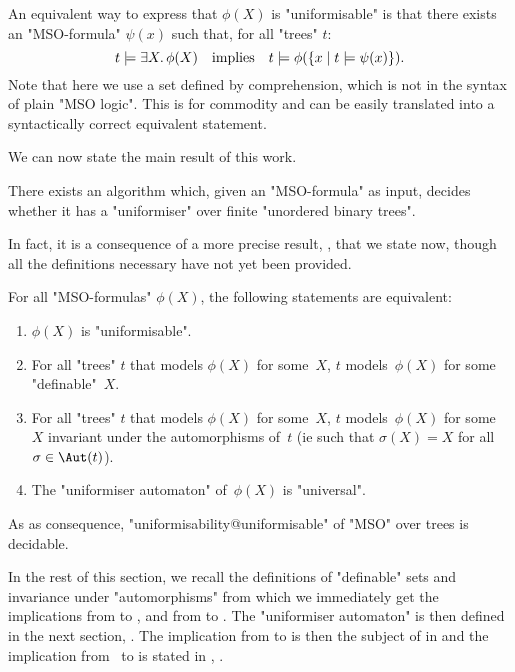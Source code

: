 \documentclass[a4paper,UKenglish,cleveref, autoref, thm-restate]{lipics-v2021}
\begin{document}
\begin{remark}\label{remark:uniformisability}
	An equivalent way to express that $\phi(X)$ is "uniformisable" is that there exists an "MSO-formula" $\psi(x)$ such that, for all "trees" $t$:
	\[
		t \models \exists X.\, \phi(X) \quad \text{implies} \quad t \models \phi(\left\{x \mid t \models \psi(x)\right\}).
	\]
	Note that here we use a set defined by comprehension, which is not in the syntax of plain "MSO logic".
	This is for commodity and can be easily translated into a syntactically correct equivalent statement.
\end{remark}

We can now state the main result of this work.
\begin{theorem} \label{thm:uniformisability-decision}\label{theorem:main}
	There exists an algorithm which, given an "MSO-formula" as input, decides whether it has a "uniformiser" over finite "unordered binary trees".
\end{theorem}

In fact, it is a consequence of a more precise result, , that we state now, though all the definitions necessary have not yet been provided.
\begin{lemma}\label{lem:main-result}\label{lemma:main}
	For all "MSO-formulas" $\phi(X)$, the following statements are equivalent:
	\begin{enumerate}
		\item $\phi(X)$ is "uniformisable". \label{lem:main-result-1}
		\item For all "trees" $t$ that models $\phi(X)$ for some~$X$, $t$ models~$\phi(X)$ for some "definable"~$X$. \label{lem:main-result-2}
		\item For all "trees" $t$ that models $\phi(X)$ for some~$X$, $t$ models~$\phi(X)$ for some~$X$ invariant under the automorphisms of~$t$ (ie such that $\sigma(X) = X$ for all $\sigma \in \Aut(t)$). \label{lem:main-result-3}
		\item The "uniformiser automaton" of~$\phi(X)$ is "universal". \label{lem:main-result-4}
	\end{enumerate}
	As as consequence, "uniformisability@uniformisable" of "MSO" over trees is decidable.
\end{lemma}
In the rest of this section, we recall the definitions of "definable" sets and invariance under "automorphisms" from which we immediately get the implications from
 to , and from  to . The "uniformiser automaton"
is then defined in the next section, . The implication from  to  is then the subject of
 in  and the implication from~ to  is stated in
, .
\end{document}
